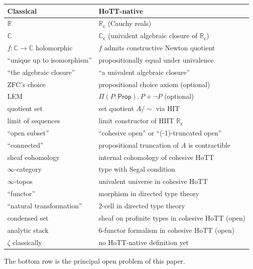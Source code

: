 \documentclass[12pt]{article}
\theoremstyle{definition}
\theoremstyle{remark}
\newcommand{\C}{\mathbb{C}}
\newcommand{\R}{\mathbb{R}}
\newcommand{\Prop}{\mathsf{Prop}}
\newcommand{\Cc}{\C_{\mathsf{c}}}
\newcommand{\Rc}{\R_{\mathsf{c}}}
\begin{document}
\begin{center}
\begin{tabular}{ll}
\toprule
Classical & HoTT-native \\
\midrule
$\R$ & $\Rc$ (Cauchy reals) \\
$\C$ & $\Cc$ (univalent algebraic closure of $\Rc$) \\
$f:\C \to \C$ holomorphic & $f$ admits constructive Newton quotient \\
``unique up to isomorphism'' & propositionally equal under univalence \\
``the algebraic closure'' & ``a univalent algebraic closure'' \\
ZFC's choice & propositional choice axiom (optional) \\
LEM & $\Pi(P:\Prop).\, P + \neg P$ (optional) \\
quotient set & set quotient $A/{\sim}$ via HIT \\
limit of sequences & limit constructor of HIIT $\Rc$ \\
``open subset'' & ``cohesive open'' or ``(-1)-truncated open'' \\
``connected'' & propositional truncation of $A$ is contractible \\
sheaf cohomology & internal cohomology of cohesive HoTT \\
$\infty$-category & type with Segal condition \\
$\infty$-topos & univalent universe in cohesive HoTT \\
``functor'' & morphism in directed type theory \\
``natural transformation'' & 2-cell in directed type theory \\
condensed set & sheaf on profinite types in cohesive HoTT (open) \\
analytic stack & 6-functor formalism in cohesive HoTT (open) \\
$\zeta$ classically & no HoTT-native definition yet \\
\bottomrule
\end{tabular}
\end{center}

\medskip

The bottom row is the principal open problem of this paper.
\end{document}
